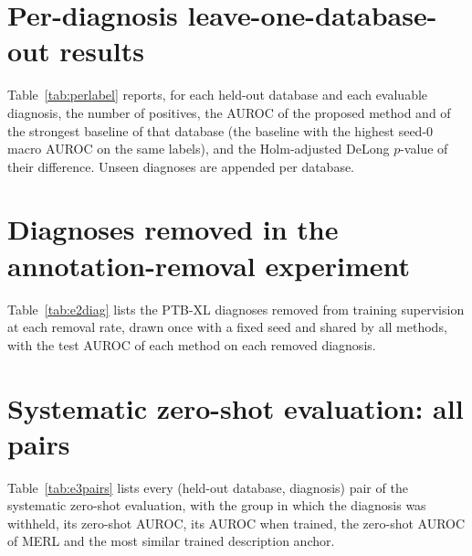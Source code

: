 \documentclass[pdflatex,sn-mathphys-num]{sn-jnl}
\begin{document}
{\footnotesize}

\section{Per-diagnosis leave-one-database-out results}\label{supp:perlabel}
Table~\ref{tab:perlabel} reports, for each held-out database and each evaluable diagnosis, the number of positives, the AUROC of the proposed method and of the strongest baseline of that database (the baseline with the highest seed-0 macro AUROC on the same labels), and the Holm-adjusted DeLong $p$-value of their difference. Unseen diagnoses are appended per database.

{\footnotesize}

\section{Diagnoses removed in the annotation-removal experiment}\label{supp:e2}
Table~\ref{tab:e2diag} lists the PTB-XL diagnoses removed from training supervision at each removal rate, drawn once with a fixed seed and shared by all methods, with the test AUROC of each method on each removed diagnosis.



\section{Systematic zero-shot evaluation: all pairs}\label{supp:e3}
Table~\ref{tab:e3pairs} lists every (held-out database, diagnosis) pair of the systematic zero-shot evaluation, with the group in which the diagnosis was withheld, its zero-shot AUROC, its AUROC when trained, the zero-shot AUROC of MERL and the most similar trained description anchor.

{\footnotesize}
\end{document}
